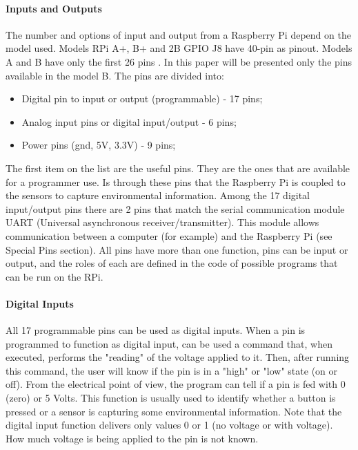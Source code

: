 \documentclass{acm_proc_article-sp}
\begin{document}
\paragraph{Inputs and Outputs}
The number and options of input and output from a Raspberry Pi depend on the model used. Models RPi A+, B+ and 2B GPIO J8 have 40-pin as pinout. Models A and B have only the first 26 pins \cite{raspUsage}. In this paper will be presented only the pins available in the model B. The pins are divided into:

\begin{itemize}
\item Digital pin to input or output (programmable) - 17 pins;	
\item Analog input pins or digital input/output - 6 pins;
\item Power pins (gnd, 5V, 3.3V) - 9 pins;
\end{itemize}

The first item on the list are the useful pins. They are the ones that are available for a programmer use. Is through these pins that the Raspberry Pi is coupled to the sensors to capture environmental information. Among the 17 digital input/output pins there are 2 pins that match the serial communication module UART (Universal asynchronous receiver/transmitter). This module allows communication between a computer (for example) and the Raspberry Pi (see Special Pins section). All pins have more than one function, pins can be input or output, and the roles of each are defined in the code of possible programs that can be run on the RPi.

\paragraph{Digital Inputs}
All 17 programmable pins can be used as digital inputs. When a pin is programmed to function as digital input, can be used a command that, when executed, performs the "reading" of the voltage applied to it. Then, after running this command, the user  will know if the pin is in a "high" or "low" state (on or off).
\newline
\newline
From the electrical point of view, the program can tell if a pin is fed with 0 (zero) or 5 Volts. This function is usually used to identify whether a button is pressed or a sensor is capturing some environmental information. Note that the digital input function delivers only values 0 or 1 (no voltage or with voltage). How much voltage is being applied to the pin is not known.
\end{document}
